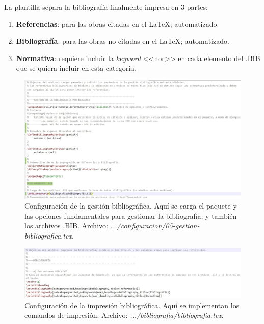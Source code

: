 La plantilla separa la bibliografía finalmente impresa en 3 partes:
\begin{enumerate}
	\item \textbf{Referencias}: para las obras citadas en el \LaTeX; automatizado.
	\item \textbf{Bibliografía}: para las obras no citadas en el \LaTeX; automatizado.
	\item \textbf{Normativa}: requiere incluir la \textit{keyword} <<nor>> en cada elemento del .BIB que se quiera incluir en esta categoría.
\end{enumerate}
%
\begin{figure}[h]
	\centering
	\includegraphics[width=1\linewidth, frame]{cuerpo/cap-referencias/imagenes/05-gestion}
	\caption[Configuración de la gestión bibliográfica.]{Configuración de la gestión bibliográfica. Aquí se carga el paquete y las opciones fundamentales para gestionar la bibliografía, y también los archivos .BIB. Archivo: \textit{.../configuracion/05-gestion-bibliografica.tex}.}
	\label{fig:05-gestion}
\end{figure}
%
\begin{figure}[h]
	\centering
	\includegraphics[width=1\linewidth, frame]{cuerpo/cap-referencias/imagenes/biblatex}
	\caption[Configuración de la impresión bibliográfica.]{Configuración de la impresión bibliográfica. Aquí se implementan los comandos de impresión. Archivo: \textit{.../bibliografia/bibliografia.tex}.}
	\label{fig:biblatex}
\end{figure}
